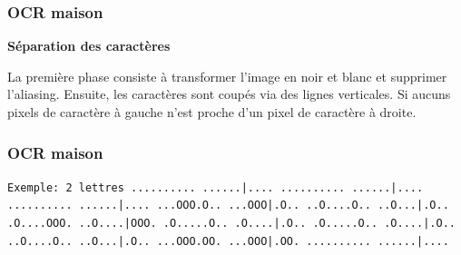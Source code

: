 \documentclass[xcolor=dvipsnames]{beamer}
\begin{document}
\begin{frame}
\frametitle{OCR maison}
    \begin{center}\begin{alertblock}{}
            \begin{center}
            \textbf{\Large Séparation des caractères}
            \end{center}

La première phase consiste à transformer l'image en noir et blanc et supprimer l'aliasing. Ensuite, les caractères sont coupés via des lignes verticales. Si aucuns pixels de caractère à gauche n'est proche d'un pixel de caractère à droite.

    \end{alertblock}\end{center}
\end{frame}

\begin{frame}
\frametitle{OCR maison}
\texttt{Exemple: 2 lettres\newline
           .......... ......|....\newline
           .......... ......|....\newline
           .......... ......|....\newline
           ...OOO.O.. ...OOO|.O..\newline
           ..O....O.. ..O...|.O..\newline
           .O....OOO. ..O....|OOO.\newline
           .O.....O.. .O....|.O..\newline
           .O.....O.. .O....|.O..\newline
           ..O....O.. ..O...|.O..\newline
           ...OOO.OO. ...OOO|.OO.\newline
           .......... ......|....\newline
}
\end{frame}






\end{document}
